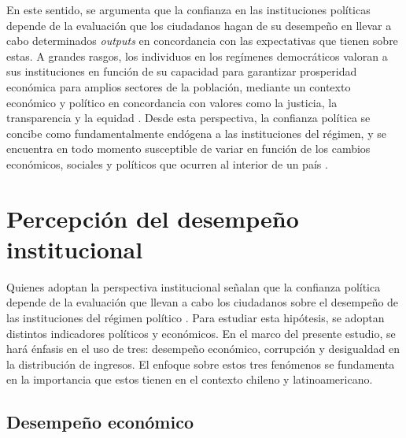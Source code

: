\documentclass[12pt,twoside]{templates/facsothesis}
\begin{document}
En este sentido, se argumenta que la confianza en las instituciones políticas depende de la evaluación que los ciudadanos hagan de su desempeño en llevar a cabo determinados \emph{outputs} en concordancia con las expectativas que tienen sobre estas. A grandes rasgos, los individuos en los regímenes democráticos valoran a sus instituciones en función de su capacidad para garantizar prosperidad económica para amplios sectores de la población, mediante un contexto económico y político en concordancia con valores como la justicia, la transparencia y la equidad \citep{andersonSensitiveLeftImpervious2008, vandermeerEconomicPerformancePolitical2018, vandermeerDeeplyRootedConcern2017, zmerliPoliticalTrust2022, zmerliIncomeInequalityDistributive2015}. Desde esta perspectiva, la confianza política se concibe como fundamentalmente endógena a las instituciones del régimen, y se encuentra en todo momento susceptible de variar en función de los cambios económicos, sociales y políticos que ocurren al interior de un país \citep{newtonSocialPoliticalTrust2017}.

\section{Percepción del desempeño institucional}\label{percepciuxf3n-del-desempeuxf1o-institucional}

Quienes adoptan la perspectiva institucional señalan que la confianza política depende de la evaluación que llevan a cabo los ciudadanos sobre el desempeño de las instituciones del régimen político \citep{vandermeerEconomicPerformancePolitical2018}. Para estudiar esta hipótesis, se adoptan distintos indicadores políticos y económicos. En el marco del presente estudio, se hará énfasis en el uso de tres: desempeño económico, corrupción y desigualdad en la distribución de ingresos. El enfoque sobre estos tres fenómenos se fundamenta en la importancia que estos tienen en el contexto chileno y latinoamericano.

\subsection{Desempeño económico}\label{desempeuxf1o-econuxf3mico}
\end{document}
